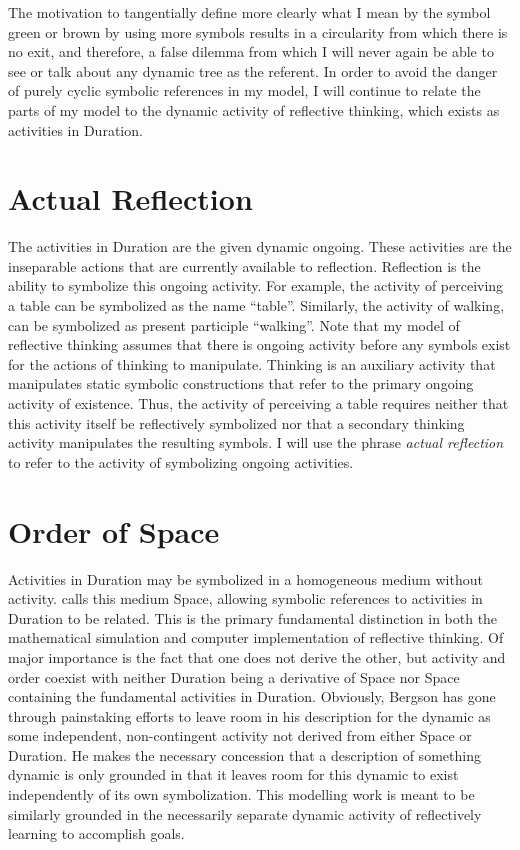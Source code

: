The motivation to tangentially define more clearly what I mean by the
symbol green or brown by using more symbols results in a circularity
from which there is no exit, and therefore, a false dilemma from which
I will never again be able to see or talk about any dynamic tree as
the referent.  In order to avoid the danger of purely cyclic symbolic
references in my model, I will continue to relate the parts of my
model to the dynamic activity of reflective thinking, which exists as
activities in Duration.

\section{Actual Reflection}

The activities in Duration are the given dynamic ongoing.  These
activities are the inseparable actions that are currently available to
reflection.  Reflection is the ability to symbolize this ongoing
activity.  For example, the activity of perceiving a table can be
symbolized as the name ``table''.  Similarly, the activity of walking,
can be symbolized as present participle ``walking''.  Note that my
model of reflective thinking assumes that there is ongoing activity
before any symbols exist for the actions of thinking to manipulate.
Thinking is an auxiliary activity that manipulates static symbolic
constructions that refer to the primary ongoing activity of existence.
Thus, the activity of perceiving a table requires neither that this
activity itself be reflectively symbolized nor that a secondary
thinking activity manipulates the resulting symbols.  I will use the
phrase \emph{actual reflection} to refer to the activity of
symbolizing ongoing activities.

\section{Order of Space}

Activities in Duration may be symbolized in a homogeneous medium
without activity.  \cite{bergson:1910} calls this medium Space,
allowing symbolic references to activities in Duration to be related.
This is the primary fundamental distinction in both the mathematical
simulation and computer implementation of reflective thinking.  Of
major importance is the fact that one does not derive the other, but
activity and order coexist with neither Duration being a derivative of
Space nor Space containing the fundamental activities in Duration.
Obviously, Bergson has gone through painstaking efforts to leave room
in his description for the dynamic as some independent, non-contingent
activity not derived from either Space or Duration.  He makes the
necessary concession that a description of something dynamic is only
grounded in that it leaves room for this dynamic to exist
independently of its own symbolization.  This modelling work is meant
to be similarly grounded in the necessarily separate dynamic activity
of reflectively learning to accomplish goals.

